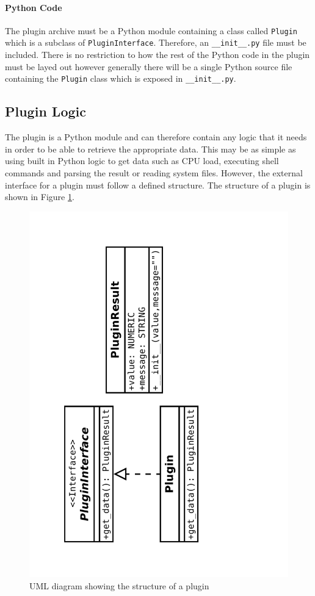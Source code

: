 \documentclass[bsc,logo,twoside,parskip,singlespacing,notimes]{infthesis}
\begin{document}
\paragraph*{Python Code}
	The plugin archive must be a Python module containing a class called
	\texttt{Plugin} which is a subclass of \texttt{PluginInterface}.  Therefore, an
	\texttt{\_\_init\_\_.py} file must be included.  There is no restriction to how
	the rest of the Python code in the plugin must be layed out however generally
	there will be a single Python source file containing the \texttt{Plugin} class
	which is exposed in \texttt{\_\_init\_\_.py}.

\subsection{Plugin Logic}
	The plugin is a Python module and can therefore contain any logic that it needs
	in order to be able to retrieve the appropriate data.  This may be as simple as
	using built in Python logic to get data such as CPU load, executing shell
	commands and parsing the result or reading system files.  However, the external
	interface for a plugin must follow a defined structure.  The structure of a
	plugin is shown in Figure \ref{plugin-uml}.

\begin{figure}[H]
	\centering
	\caption{UML diagram showing the structure of a plugin}
	\label{plugin-uml}
	\includegraphics[scale=0.35,angle=-90]{assets/plugin-uml.pdf}
	\vspace{-5em}
\end{figure}
\end{document}
